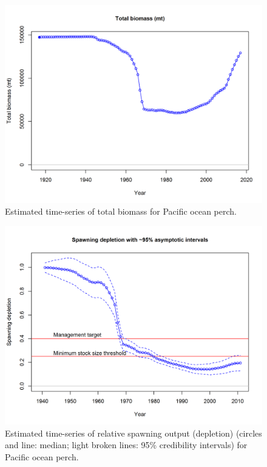 \documentclass[12pt,]{article}
\begin{document}
\begin{figure}
\centering
\includegraphics{r4ss/plots_mod1/ts1_Total_biomass_(mt).png}
\caption{Estimated time-series of total biomass for Pacific ocean perch.
\label{fig:total_bio}}
\end{figure}

\FloatBarrier

\begin{figure}
\centering
\includegraphics{r4ss/plots_mod1/ts9_Spawning_depletion_with_95_asymptotic_intervals_intervals.png}
\caption{Estimated time-series of relative spawning output (depletion)
(circles and line: median; light broken lines: 95\% credibility
intervals) for Pacific ocean perch. \label{fig:depl}}
\end{figure}
\end{document}
